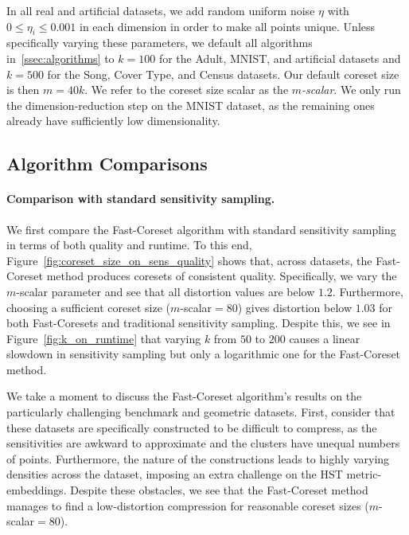 In all real and artificial datasets, we add random uniform noise $\eta$ with $0 \leq \eta_i \leq 0.001$ in each dimension in order to make all points unique.
Unless specifically varying these parameters, we default all algorithms in~\ref{ssec:algorithms} to $k=100$ for the Adult, MNIST, and artificial datasets and
$k=500$ for the Song, Cover Type, and Census datasets. Our default coreset size is then $m = 40k$. We refer to the coreset size scalar as the \emph{$m$-scalar}.
We only run the dimension-reduction step on the MNIST dataset, as the remaining ones already have sufficiently low dimensionality.

\subsection{Algorithm Comparisons}
\label{ssec:alg_qualities}



\paragraph*{Comparison with standard sensitivity sampling.}

We first compare the Fast-Coreset algorithm with standard sensitivity sampling in terms of both quality and runtime.  To this end,
Figure~\ref{fig:coreset_size_on_sens_quality} shows that, across datasets, the Fast-Coreset method produces coresets of consistent quality. Specifically, we
vary the $m$-scalar parameter and see that all distortion values are below $1.2$. Furthermore, choosing a sufficient coreset size ($m$-scalar$=80$) gives
distortion below $1.03$ for both Fast-Coresets and traditional sensitivity sampling. Despite this, we see in Figure~\ref{fig:k_on_runtime} that varying $k$ from
$50$ to $200$ causes a linear slowdown in sensitivity sampling but only a logarithmic one for the Fast-Coreset method.

We take a moment to discuss the Fast-Coreset algorithm's results on the particularly challenging benchmark and geometric datasets.  First, consider that these
datasets are specifically constructed to be difficult to compress, as the sensitivities are awkward to approximate and the clusters have unequal numbers of points.
Furthermore, the nature of the constructions leads to highly varying densities across the dataset, imposing an extra challenge on the HST metric-embeddings.
Despite these obstacles, we see that the Fast-Coreset method manages to find a low-distortion compression for reasonable coreset sizes ($m$-scalar$=80$).

